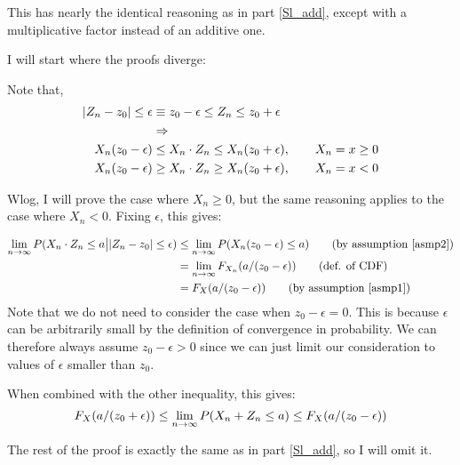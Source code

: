 
This has nearly the identical reasoning as in part \ref{Sl_add}, except with a multiplicative factor instead of an additive one.

I will start where the proofs diverge:


Note that,    
\begin{align*}
    \lvert Z_n - z_0\rvert \leq \epsilon &\equiv z_0 - \epsilon \leq Z_n \leq z_0 + \epsilon \\
                               &\Rightarrow \\
    X_n (z_0 - \epsilon) &\leq X_n \cdot Z_n \leq X_n(z_0 + \epsilon), \quad\quad X_n = x \geq 0\\
    X_n (z_0 - \epsilon) &\geq X_n \cdot Z_n \geq X_n(z_0 + \epsilon), \quad\quad X_n = x < 0\\
\end{align*}

Wlog, I will prove the case where $X_n \geq 0$, but the same reasoning applies to the case where $X_n < 0$.
Fixing $\epsilon$, this gives:

\begin{align*}
    \limit{n}{\infty} P(X_n \cdot Z_n \leq a \big\lvert \abs{Z_n - z_0} \leq \epsilon) 
                                                          &\leq \limit{n}{\infty} P(X_n (z_0 - \epsilon) \leq a   )\tag*{(by assumption \ref{asmp2})}\\ 
                                                          &= \limit{n}{\infty} F_{X_n }(a/(z_0- \epsilon))        \tag*{(def. of CDF)}\\
                                                          &= F_{X }(a/(z_0- \epsilon))\tag*{(by assumption \ref{asmp1})}\\  
\end{align*}
Note that we do not need to consider the case when $z_0 - \epsilon = 0$.
This is because $\epsilon$ can be arbitrarily small by the definition of convergence in probability.
We can therefore always assume $z_0 - \epsilon > 0$ since we can just limit our consideration to values of $\epsilon$ smaller than $z_0$.

When combined with the other inequality, this gives:
\begin{equation*}
    F_{X}(a /(z_0 + \epsilon ))   \leq  \underset{n\rightarrow \infty}{\lim}\, P(X_n + Z_n \leq a) \leq F_{X}(a /(z_0 - \epsilon ))\\
\end{equation*}

The rest of the proof is exactly the same as in part \ref{Sl_add}, so I will omit it.
